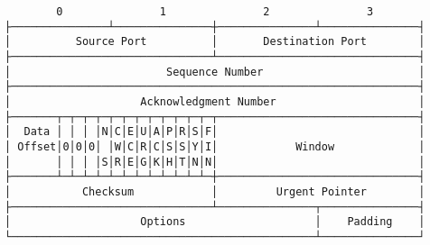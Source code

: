 \documentclass[varwidth=25cm,crop]{standalone}
\begin{document}
\begin{verbatim}
        0               1               2               3
├───────────────┴───────────────┼───────────────┴───────────────┤
│          Source Port          │       Destination Port        │
├───────────────────────────────┴───────────────────────────────┤
│                        Sequence Number                        │
├───────────────────────────────────────────────────────────────┤
│                    Acknowledgment Number                      │
├───────┬─┬─┬─┬─┬─┬─┬─┬─┬─┬─┬─┬─┬───────────────────────────────┤
│  Data │ │ │ │N│C│E│U│A│P│R│S│F│                               │
│ Offset│0│0│0│ │W│C│R│C│S│S│Y│I│            Window             │
│       │ │ │ │S│R│E│G│K│H│T│N│N│                               │
├───────┴─┴─┴─┴─┴─┴─┴─┴─┴─┴─┴─┴─┼───────────────────────────────┤
│           Checksum            │         Urgent Pointer        │
├───────────────────────────────┴───────────────┬───────────────┤
│                    Options                    │    Padding    │
└───────────────────────────────────────────────┴───────────────┘
\end{verbatim}
\end{document}
